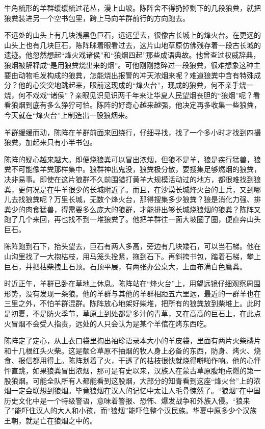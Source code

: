 \par 牛角梳形的羊群缓缓梳过花丛，漫上山坡。陈阵舍不得扔掉剩下的几段狼粪，就把狼粪装进另一个空书包里，跨上马向羊群前行的方向跑去。
\par 不远处的山头上有几块浅黑色巨石，远远望去，很像古长城上的烽火台。在更远的山头上也有几块巨石，陈阵眯着眼看过去，这片山地草原仿佛残存着一段古长城的遗迹。他忽然想起“烽火戏诸侯”和“狼烟四起”那些成语典故。他曾查过权威辞典，狼烟被解释成“是用狼粪烧出来的烟”。可他刚刚捻碎过一段狼粪，很难想象这种主要由动物毛发构成的狼粪，怎能烧出报警的冲天浓烟来呢？难道狼粪中含有特殊成分？他的心突突地跳起来，眼前这现成的“烽火台”，现成的狼粪，何不亲手烧一烧，何不戏戏“诸侯”？亲眼见识见识两千年来让华夏人民望烟丧胆的“狼烟”呢？看看狼烟到底有多么狰狞可怕。陈阵的好奇心越来越强，他决定再多收集一些狼粪，今天就在“烽火台”上制造出一股狼烟来。
\par 羊群缓缓而动，陈阵在羊群前面来回绕行，仔细寻找，找了一个多小时才找到四撮狼粪，加起来只有小半书包。
\par 陈阵的疑心越来越大。即便烧狼粪可以冒出浓烟，但狼不是羊，狼是疾行猛兽，狼粪不可能像羊粪那样集中。狼群神出鬼没，狼粪极分散，要搜集足够燃烟的狼粪，决非易事。即使在这片狼群不久前围猎打黄羊大规模活动过的地方，都很难找到狼粪，更何况是在牛羊很少的长城附近了。而且，在沙漠长城烽火台的士兵，又到哪儿去找狼粪呢？万里长城，无数个烽火台，那得搜集多少狼粪？狼是消化力强、排粪少的肉食猛兽，得需要多么庞大的狼群，才能排出够长城烧狼烟的狼粪？陈阵又跑了几个来回，再也找不到一堆狼粪了。他把羊群往一面大坡圈了圈，便直奔山头巨石。
\par 陈阵跑到石下，抬头望去，巨石有两人多高，旁边有几块矮石，可以当石梯。他在山沟里找了一大抱枯枝，用马笼头拴紧，拖到石下。再斜挎书包，踏着石梯，攀上巨石，并把枯柴拽上石顶。石顶平展，有两张办公桌大，上面布满白色鹰粪。
\par 时近正午，羊群已卧在草地上休息。陈阵站在“烽火台”上，用望远镜仔细观察周围形势，没有发现一条狼。他的羊群与其他的羊群相距五六里远，最近的一群羊也在三里之外，不怕羊群混群。陈阵放心地架好柴堆，把所有的狼粪放到柴堆上。此时是初夏，不是防火季节，草原上到处都是多汁的青草，又在高高的巨石上，在此点火冒烟不会受人指责，远处的人只会认为是某个羊倌在烤东西吃。
\par 陈阵定了定心，从上衣口袋里掏出袖珍语录本大小的羊皮袋，里面有两片火柴磷片和十几根红头火柴。这是额仑草原不抽烟的牧人身上必备的东西，防身、烤火、烧食、报信都用得上。陈阵划着了火，干透了的枯枝很快就烧得噼啪作响。他的心怦怦直跳，如果狼粪冒出浓烟，那可是有史以来，汉族人在蒙古草原腹地点燃的第一股狼烟。可能全队所有人都能看到这股烟，大部分的知青看到这座“烽火台”上的浓烟一定会联想到狼烟。毕竟狼烟在汉人的记忆中太让人毛骨悚然了。“狼烟”在中国历史文化中是一个特级警语，意味着警报、恐怖、爆发战争和外族入侵。“狼来了”能吓住汉人的大人和小孩，而“狼烟”能吓住整个汉民族。华夏中原多少个汉族王朝，就是亡在狼烟之中的。
